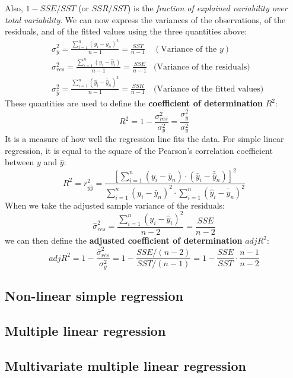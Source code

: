 Also, $1 - SSE/SST$ (or $SSR/SST$) is the \textit{fraction of explained variability over total variability}. We can now express the variances of the observations, of the residuals, and of the fitted values using the three quantities above:
\begin{align*}
    &\sigma_y^2 = \frac{\sum_{i=1}^n (y_i - \bar{y}_n)^2}{n-1} = \frac{SST}{n-1} &(\text{Variance of the } y)\\
    &\sigma_{res}^2 = \frac{\sum_{i=1}^n (y_i - \hat{y}_i)}{n-1} = \frac{SSE}{n-1} &\text{(Variance of the residuals)}\\
    &\sigma_{\hat{y}}^2 = \frac{\sum_{i=1}^n (\hat{y}_i - \bar{\hat{y}}_n)^2}{n-1} = \frac{SSR}{n-1} &\text{(Variance of the fitted values)}
\end{align*}
These quantities are used to define the \textbf{coefficient of determination} $R^2$:
\[
    R^2 = 1 - \frac{\sigma_{res}^2}{\sigma_y^2} = \frac{\sigma_{\hat{y}}^2}{\sigma_y^2}
\]
It is a measure of how well the regression line fits the data. For simple linear regression, it is equal to the square of the Pearson's correlation coefficient between $y$ and $\hat{y}$:
\[
    R^2 = r_{y\hat{y}}^2 = \frac{[\sum_{i=1}^n (y_i - \bar{y}_n) \cdot (\hat{y}_i - \bar{\hat{y}}_n)]^2}{\sum_{i=1}^n (y_i - \bar{y}_n)^2 \cdot \sum_{i=1}^n (\hat{y}_i - \bar{\hat{y}}_n)^2}
\]
When we take the adjusted sample variance of the residuals:
\[
    \hat{\sigma}_{res}^2 = \frac{\sum_{i=1}^n (y_i - \hat{y}_i)^2}{n-2} = \frac{SSE}{n-2}
\]
we can then define the \textbf{adjusted coefficient of determination} $\textit{adj}{R}^2$:
\[
    \textit{adj}{R}^2 = 1 - \frac{\hat{\sigma}_{res}^2}{\sigma_y^2} = 1 - \frac{SSE/(n-2)}{SST/(n-1)} = 1 - \frac{SSE}{SST} \cdot \frac{n-1}{n-2}
\]



\subsection{Non-linear simple regression}

\subsection{Multiple linear regression}

\subsection{Multivariate multiple linear regression}

